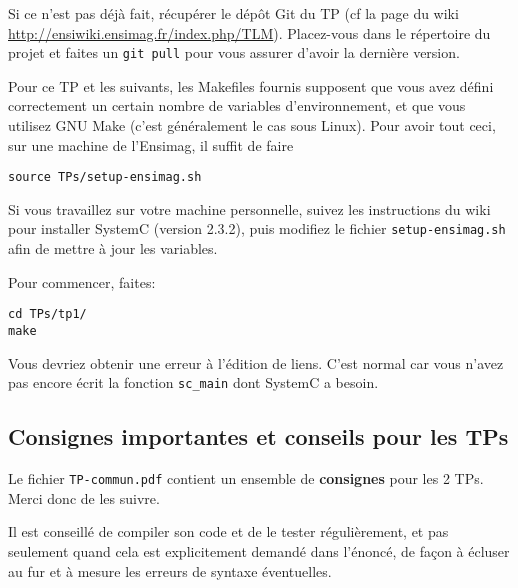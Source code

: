\documentclass[12pt,a4paper]{article}
\begin{document}
\newcommand{\vv}{\vspace{0.2 cm}}

\vspace{-2 cm}
\maketitle
\vspace{-1 cm}

Si ce n'est pas déjà fait, récupérer le dépôt Git du TP (cf la page du wiki \url{http://ensiwiki.ensimag.fr/index.php/TLM}).
Placez-vous dans le répertoire du projet et faites un \texttt{git pull} pour vous assurer d'avoir la dernière version.

Pour ce TP et les suivants, les Makefiles fournis supposent que vous avez défini correctement un certain nombre de variables d'environnement, et que vous utilisez GNU Make (c'est généralement le cas sous Linux).
Pour avoir tout ceci, sur une machine de l'Ensimag, il suffit de faire
\begin{lstlisting}[basicstyle=\ttfamily \small]
source TPs/setup-ensimag.sh
\end{lstlisting}
Si vous travaillez sur votre machine personnelle, suivez les instructions du wiki pour installer SystemC (version 2.3.2), puis modifiez le fichier \texttt{setup-ensimag.sh} afin de mettre à jour les variables.

Pour commencer, faites:
\begin{lstlisting}
cd TPs/tp1/
make
\end{lstlisting}
Vous devriez obtenir une erreur à l'édition de liens.
C'est normal car vous n'avez pas encore écrit la fonction \texttt{sc\_main} dont SystemC a besoin.

\subsection*{Consignes importantes et conseils pour les TPs}

Le fichier \texttt{TP-commun.pdf} contient un ensemble de \textbf{consignes} pour les 2 TPs.
Merci donc de les suivre.

Il est conseillé de compiler son code et de le tester régulièrement, et pas seulement quand cela est explicitement demandé dans l'énoncé, de façon à écluser au fur et à mesure les erreurs de syntaxe éventuelles.
\end{document}
